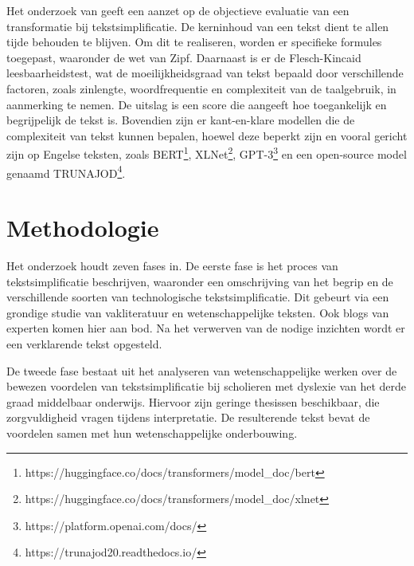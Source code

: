 Het onderzoek van \textcite{VasquezRodriguez2021} geeft een aanzet op de objectieve evaluatie van een transformatie bij tekstsimplificatie. De kerninhoud van een tekst dient te allen tijde behouden te blijven. Om dit te realiseren, worden er specifieke formules toegepast, waaronder de wet van Zipf. Daarnaast is er de Flesch-Kincaid leesbaarheidstest, wat de moeilijkheidsgraad van tekst bepaald door verschillende factoren, zoals zinlengte, woordfrequentie en complexiteit van de taalgebruik, in aanmerking te nemen. De uitslag is een score die aangeeft hoe toegankelijk en begrijpelijk de tekst is. Bovendien zijn er kant-en-klare modellen die de complexiteit van tekst kunnen bepalen, hoewel deze beperkt zijn en vooral gericht zijn op Engelse teksten, zoals BERT\footnote{https://huggingface.co/docs/transformers/model\_doc/bert}, XLNet\footnote{https://huggingface.co/docs/transformers/model\_doc/xlnet}, GPT-3\footnote{https://platform.openai.com/docs/} en een open-source model genaamd TRUNAJOD\footnote{https://trunajod20.readthedocs.io/}.

\section{Methodologie}%
\label{sec:methodologie}


Het onderzoek houdt zeven fases in. De eerste fase is het proces van tekstsimplificatie beschrijven, waaronder een omschrijving van het begrip en de verschillende soorten van technologische tekstsimplificatie. Dit gebeurt via een grondige studie van vakliteratuur en wetenschappelijke teksten. Ook blogs van experten komen hier aan bod. Na het verwerven van de nodige inzichten wordt er een verklarende tekst opgesteld.

De tweede fase bestaat uit het analyseren van wetenschappelijke werken over de bewezen voordelen van tekstsimplificatie bij scholieren met dyslexie van het derde graad middelbaar onderwijs. Hiervoor zijn geringe thesissen beschikbaar, die zorgvuldigheid vragen tijdens interpretatie. De resulterende tekst bevat de voordelen samen met hun wetenschappelijke onderbouwing.

